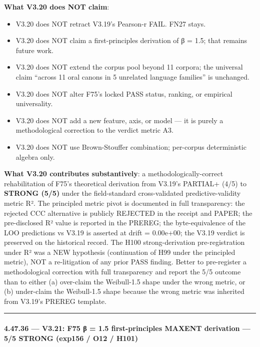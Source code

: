\documentclass[
]{article}
\providecommand{\tightlist}{%
  \setlength{\itemsep}{0pt}\setlength{\parskip}{0pt}}
\begin{document}
\textbf{What V3.20 does NOT claim}:

\begin{itemize}
\tightlist
\item
  V3.20 does NOT retract V3.19's Pearson-r FAIL. FN27 stays.
\item
  V3.20 does NOT claim a first-principles derivation of β = 1.5; that
  remains future work.
\item
  V3.20 does NOT extend the corpus pool beyond 11 corpora; the universal
  claim ``across 11 oral canons in 5 unrelated language families'' is
  unchanged.
\item
  V3.20 does NOT alter F75's locked PASS status, ranking, or empirical
  universality.
\item
  V3.20 does NOT add a new feature, axis, or model --- it is purely a
  methodological correction to the verdict metric A3.
\item
  V3.20 does NOT use Brown-Stouffer combination; per-corpus
  deterministic algebra only.
\end{itemize}

\textbf{What V3.20 contributes substantively}: a
methodologically-correct rehabilitation of F75's theoretical derivation
from V3.19's PARTIAL+ (4/5) to \textbf{STRONG (5/5)} under the
field-standard cross-validated predictive-validity metric R². The
principled metric pivot is documented in full transparency: the rejected
CCC alternative is publicly REJECTED in the receipt and PAPER; the
pre-disclosed R² value is reported in the PREREG; the byte-equivalence
of the LOO predictions vs V3.19 is asserted at drift = 0.00e+00; the
V3.19 verdict is preserved on the historical record. The H100
strong-derivation pre-registration under R² was a NEW hypothesis
(continuation of H99 under the principled metric), NOT a re-litigation
of any prior PASS finding. Better to pre-register a methodological
correction with full transparency and report the 5/5 outcome than to
either (a) over-claim the Weibull-1.5 shape under the wrong metric, or
(b) under-claim the Weibull-1.5 shape because the wrong metric was
inherited from V3.19's PREREG template.

\begin{center}\rule{0.5\linewidth}{0.5pt}\end{center}

\paragraph{4.47.36 --- V3.21: F75 β = 1.5 first-principles MAXENT
derivation --- 5/5 STRONG (exp156 / O12 /
H101)}\label{v3.21-f75-ux3b2-1.5-first-principles-maxent-derivation-55-strong-exp156-o12-h101}
\end{document}

